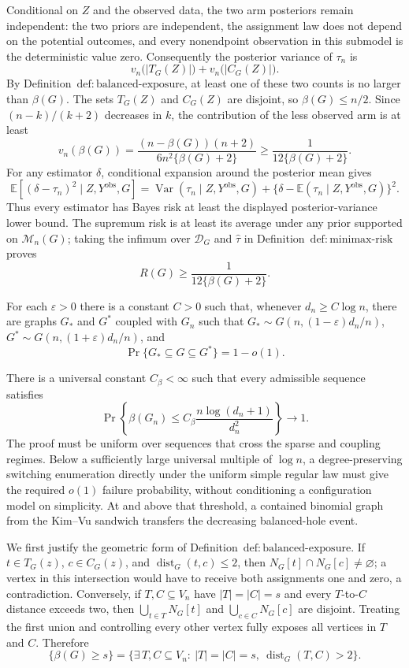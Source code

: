 Conditional on \(Z\) and the observed data, the two arm posteriors remain independent: the two priors are independent, the assignment law does not depend on the potential outcomes, and every nonendpoint observation in this submodel is the deterministic value zero.  Consequently the posterior variance of \(\tau_n\) is
\[
v_n\bigl(|T_G(Z)|\bigr)+v_n\bigl(|C_G(Z)|\bigr).
\]
By Definition~\(\mathrm{def{:}balanced\mbox{-}exposure}\), at least one of these two counts is no larger than \(\beta(G)\).  The sets \(T_G(Z)\) and \(C_G(Z)\) are disjoint, so \(\beta(G)\le n/2\).  Since \((n-k)/(k+2)\) decreases in \(k\), the contribution of the less observed arm is at least
\[
v_n(\beta(G))
=\frac{(n-\beta(G))(n+2)}{6n^2\{\beta(G)+2\}}
\ge\frac1{12\{\beta(G)+2\}}.
\]
For any estimator \(\delta\), conditional expansion around the posterior mean gives
\[
\mathbb E[(\delta-\tau_n)^2\mid Z,Y^{\mathrm{obs}},G]
=\operatorname{Var}(\tau_n\mid Z,Y^{\mathrm{obs}},G)
+\{\delta-\mathbb E(\tau_n\mid Z,Y^{\mathrm{obs}},G)\}^2.
\]
Thus every estimator has Bayes risk at least the displayed posterior-variance lower bound.  The supremum risk is at least its average under any prior supported on \(\mathcal M_n(G)\); taking the infimum over \(\mathcal D_G\) and \(\widehat\tau\) in Definition~\(\mathrm{def{:}minimax\mbox{-}risk}\) proves
\[
R(G)\ge\frac1{12\{\beta(G)+2\}}.
\]

For each \(\varepsilon>0\) there is a constant \(C>0\) such that, whenever \(d_n\ge C\log n\), there are graphs \(G_*\) and \(G^*\) coupled with \(G_n\) such that \(G_*\sim G(n,(1-\varepsilon)d_n/n)\), \(G^*\sim G(n,(1+\varepsilon)d_n/n)\), and
\[
\Pr\{G_*\subseteq G\subseteq G^*\}=1-o(1).
\]

There is a universal constant \(C_\beta<\infty\) such that every admissible sequence satisfies
\[
\Pr\!\left\{\beta(G_n)\le C_\beta\frac{n\log(d_n+1)}{d_n^2}\right\}\longrightarrow1.
\]
The proof must be uniform over sequences that cross the sparse and coupling regimes.  Below a sufficiently large universal multiple of \(\log n\), a degree-preserving switching enumeration directly under the uniform simple regular law must give the required \(o(1)\) failure probability, without conditioning a configuration model on simplicity.  At and above that threshold, a contained binomial graph from the Kim--Vu sandwich transfers the decreasing balanced-hole event.

We first justify the geometric form of Definition~\(\mathrm{def{:}balanced\mbox{-}exposure}\).  If \(t\in T_G(z)\), \(c\in C_G(z)\), and \(\operatorname{dist}_G(t,c)\le2\), then \(N_G[t]\cap N_G[c]\ne\varnothing\); a vertex in this intersection would have to receive both assignments one and zero, a contradiction.  Conversely, if \(T,C\subseteq V_n\) have \(|T|=|C|=s\) and every \(T\)-to-\(C\) distance exceeds two, then \(\bigcup_{t\in T}N_G[t]\) and \(\bigcup_{c\in C}N_G[c]\) are disjoint.  Treating the first union and controlling every other vertex fully exposes all vertices in \(T\) and \(C\).  Therefore
\[
\{\beta(G)\ge s\}
=\{\exists\,T,C\subseteq V_n:\ |T|=|C|=s,\ \operatorname{dist}_G(T,C)>2\}.
\tag{1}
\]

